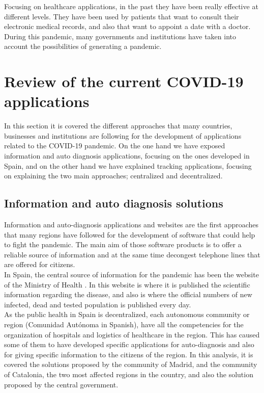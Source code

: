 \documentclass[a4paper, 12pt]{article}
\begin{document}
Focusing on healthcare applications, in the past they have been really effective at different levels. They have been used by patients that want to consult their electronic medical records, and also that want to appoint a date with a doctor. During this pandemic, many governments and institutions have taken into account the possibilities of generating a pandemic.


\section{Review of the current COVID-19 applications}
\label{section:review}

In this section it is covered the different approaches that many countries, businesses and institutions are following for the development of applications related to the COVID-19 pandemic. On the one hand we have exposed information and auto diagnosis applications, focusing on the ones developed in Spain, and on the other hand we have explained tracking applications, focusing on explaining the two main approaches; centralized and decentralized.

\subsection{Information and auto diagnosis solutions}
\label{subsection:information-auto-diagnosis}

Information and auto-diagnosis applications and websites are the first approaches that many regions have followed for the development of software that could help to fight the pandemic. The main aim of those software products is to offer a reliable source of information and at the same time decongest telephone lines that are offered for citizens. \\

In Spain, the central source of information for the pandemic has been the website of the Ministry of Health \cite{ministerio-sanidad}. In this website is where it is published the scientific information regarding the disease, and also is where the official numbers of new infected, dead and tested population is published every day.\\

As the public health in Spain is decentralized, each autonomous community or region (Comunidad Autónoma in Spanish), have all the competencies for the organization of hospitals and logistics of healthcare in the region. This has caused some of them to have developed specific applications for auto-diagnosis and also for giving specific information to the citizens of the region. In this analysis, it is covered the solutions proposed by the community of Madrid, and the community of Catalonia, the two most affected regions in the country, and also the solution proposed by the central government.
\end{document}
